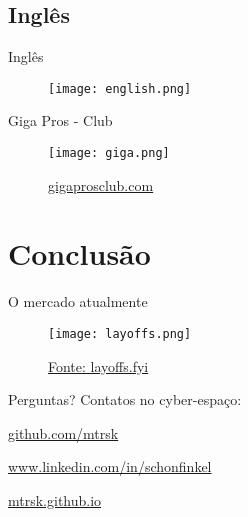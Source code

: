 \documentclass{beamer}
\begin{document}
  \subsection{Inglês}
  \begin{frame}{Inglês}
    \begin{figure}
    \centering
        \texttt{[image: english.png]}
    \end{figure}
  \end{frame}

  \begin{frame}{Giga Pros - Club}
    \begin{figure}
    \centering
        \texttt{[image: giga.png]}
        \caption{\href{https://gigaprosclub.com/}{gigaprosclub.com}}
    \end{figure}
  \end{frame}

  \section{Conclusão}
  \begin{frame}{O mercado atualmente}
    \begin{figure}
    \centering
        \texttt{[image: layoffs.png]}
        \caption{\href{https://layoffs.fyi}{Fonte: layoffs.fyi}}
    \end{figure}
  \end{frame}

  \begin{frame}{Perguntas?}
    Contatos no cyber-espaço:

    \begin{center}\href{https://github.com/mtrsk}{github.com/mtrsk}\end{center}
    \begin{center}\href{https://www.linkedin.com/in/schonfinkel/}{www.linkedin.com/in/schonfinkel}\end{center}
    \begin{center}\href{https://mtrsk.github.io}{mtrsk.github.io}\end{center}

  \end{frame}
\end{document}
